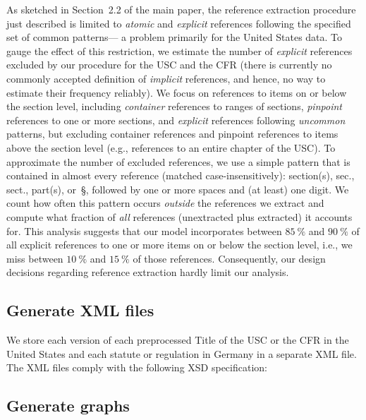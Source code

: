 \documentclass[utf8,sort&compress,numbers,square,table,hidelinks]{frontiers_suppmat} %
\begin{document}
As sketched in Section~2.2 of the main paper, 
the reference extraction procedure just described is limited to \emph{atomic} and \emph{explicit} references following the specified set of common patterns---%
a problem primarily for the United States data.
To gauge the effect of this restriction, we estimate the number of \emph{explicit} references excluded by our procedure for the USC and the CFR (there is currently no commonly accepted definition of \emph{implicit} references, and hence, no way to estimate their frequency reliably).
We focus on references to items on or below the section level, including \emph{container} references to ranges of sections, \emph{pinpoint} references to one or more sections, and \emph{explicit} references following \emph{uncommon} patterns, but excluding container references and pinpoint references to items above the section level (e.g., references to an entire chapter of the USC).
To approximate the number of excluded references, we use a simple pattern that is contained in almost every reference (matched case-insensitively):  
section(s), sec., sect., part(s), or~§, followed by one or more spaces and (at least) one digit.
We count how often this pattern occurs \emph{outside} the references we extract and compute what fraction of \emph{all} references (unextracted plus extracted) it accounts for. 
This analysis suggests that our model incorporates between $85~\%$ and $90~\%$ of all explicit references to one or more items on or below the section level, i.e., we miss between $10~\%$ and $15~\%$ of those references. 
Consequently, our design decisions regarding reference extraction hardly limit our analysis.
\vspace*{6pt}
\subsection{Generate XML files}

We store each version of each preprocessed Title of the USC or the CFR in the United States and each statute or regulation in Germany in a separate XML file.
The XML files comply with the following XSD specification:

\begin{multicols}{2}
\lstset{basicstyle=\tiny}

\end{multicols}

\vspace*{-6pt}
\subsection{Generate graphs}
\end{document}

